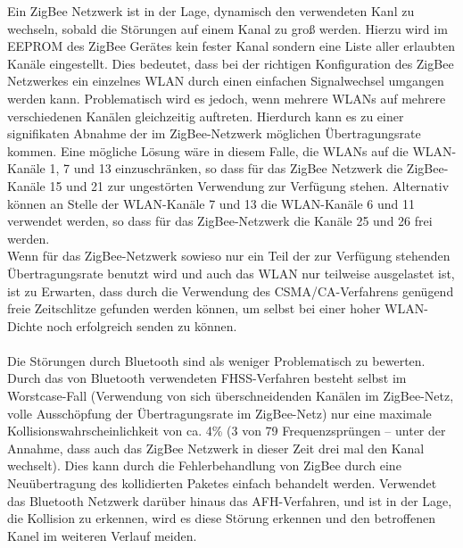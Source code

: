                 Ein ZigBee Netzwerk ist in der Lage, dynamisch den verwendeten Kanl zu wechseln, sobald die
                Störungen auf einem Kanal zu groß werden. Hierzu wird im EEPROM des ZigBee Gerätes kein fester
                Kanal sondern eine Liste aller erlaubten Kanäle eingestellt. Dies bedeutet, dass bei der
                richtigen Konfiguration des ZigBee Netzwerkes ein einzelnes WLAN durch einen einfachen Signalwechsel
                umgangen werden kann. Problematisch wird es jedoch, wenn mehrere WLANs auf mehrere verschiedenen
                Kanälen gleichzeitig auftreten. Hierdurch kann es zu einer signifikaten Abnahme der im ZigBee-Netzwerk
                möglichen Übertragungsrate kommen. Eine mögliche Lösung wäre in diesem Falle, die WLANs auf
                die WLAN-Kanäle 1, 7 und 13 einzuschränken, so dass für das ZigBee Netzwerk die ZigBee-Kanäle
                15 und 21 zur ungestörten Verwendung zur Verfügung stehen. Alternativ können an Stelle der WLAN-Kanäle 7 
                und 13 die WLAN-Kanäle 6 und 11 verwendet werden, so dass für das ZigBee-Netzwerk die Kanäle 25 und
                26 frei werden.\\
                Wenn für das ZigBee-Netzwerk sowieso nur ein Teil der zur Verfügung stehenden Übertragungsrate benutzt
                wird und auch das WLAN nur teilweise ausgelastet ist, ist zu Erwarten, dass durch die Verwendung
                des CSMA/CA-Verfahrens genügend freie Zeitschlitze gefunden werden können, um selbst bei einer
                hoher WLAN-Dichte noch erfolgreich senden zu können.\\
                \\
                Die Störungen durch Bluetooth sind als weniger Problematisch zu bewerten. Durch das von Bluetooth
                verwendeten FHSS-Verfahren besteht selbst im Worstcase-Fall (Verwendung von sich überschneidenden
                Kanälen im ZigBee-Netz, volle Ausschöpfung der Übertragungsrate im ZigBee-Netz) nur eine maximale
                Kollisionswahrscheinlichkeit von ca. 4\% (3 von 79 Frequenzsprüngen -- unter der Annahme, dass auch
                das ZigBee Netzwerk in dieser Zeit drei mal den Kanal wechselt). Dies kann durch die Fehlerbehandlung
                von ZigBee durch eine Neuübertragung des kollidierten Paketes einfach behandelt werden. Verwendet
                das Bluetooth Netzwerk darüber hinaus das AFH-Verfahren, und ist in der Lage, die Kollision zu
                erkennen, wird es diese Störung erkennen und den betroffenen Kanel im weiteren Verlauf meiden.\\
